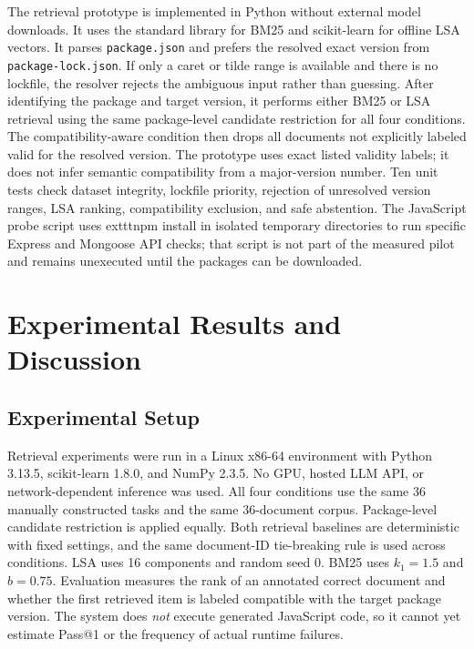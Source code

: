 \documentclass[conference]{IEEEtran}
\begin{document}
The retrieval prototype is implemented in Python without external model downloads. It uses the standard library for BM25 and scikit-learn for offline LSA vectors. It parses \texttt{package.json} and prefers the resolved exact version from \texttt{package-lock.json}. If only a caret or tilde range is available and there is no lockfile, the resolver rejects the ambiguous input rather than guessing. After identifying the package and target version, it performs either BM25 or LSA retrieval using the same package-level candidate restriction for all four conditions. The compatibility-aware condition then drops all documents not explicitly labeled valid for the resolved version. The prototype uses exact listed validity labels; it does not infer semantic compatibility from a major-version number. Ten unit tests check dataset integrity, lockfile priority, rejection of unresolved version ranges, LSA ranking, compatibility exclusion, and safe abstention. The JavaScript probe script uses 	exttt{npm install} in isolated temporary directories to run specific Express and Mongoose API checks; that script is not part of the measured pilot and remains unexecuted until the packages can be downloaded.

\section{Experimental Results and Discussion}

\subsection{Experimental Setup}
Retrieval experiments were run in a Linux x86-64 environment with Python 3.13.5, scikit-learn 1.8.0, and NumPy 2.3.5. No GPU, hosted LLM API, or network-dependent inference was used. All four conditions use the same 36 manually constructed tasks and the same 36-document corpus. Package-level candidate restriction is applied equally. Both retrieval baselines are deterministic with fixed settings, and the same document-ID tie-breaking rule is used across conditions. LSA uses 16 components and random seed 0. BM25 uses $k_1=1.5$ and $b=0.75$. Evaluation measures the rank of an annotated correct document and whether the first retrieved item is labeled compatible with the target package version. The system does \emph{not} execute generated JavaScript code, so it cannot yet estimate Pass@1 or the frequency of actual runtime failures.
\end{document}
